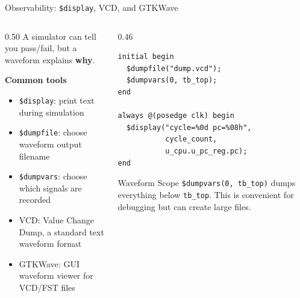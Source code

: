 \documentclass[aspectratio=169,10pt]{beamer}
\begin{document}
\begin{frame}[fragile]{Observability: \texttt{\$display}, VCD, and GTKWave}
  \begin{columns}[T]
    \begin{column}{0.50\textwidth}
      A simulator can tell you pass/fail, but a waveform explains \textbf{why}.

      \vspace{0.7em}
      \textbf{Common tools}
      \begin{itemize}
        \item \texttt{\$display}: print text during simulation
        \item \texttt{\$dumpfile}: choose waveform output filename
        \item \texttt{\$dumpvars}: choose which signals are recorded
        \item VCD: Value Change Dump, a standard text waveform format
        \item GTKWave: GUI waveform viewer for VCD/FST files
      \end{itemize}
    \end{column}
    \begin{column}{0.46\textwidth}
\begin{lstlisting}
initial begin
  $dumpfile("dump.vcd");
  $dumpvars(0, tb_top);
end

always @(posedge clk) begin
  $display("cycle=%0d pc=%08h",
           cycle_count,
           u_cpu.u_pc_reg.pc);
end
\end{lstlisting}

      \vspace{0.4em}
      \begin{block}{Waveform Scope}
        \texttt{\$dumpvars(0, tb\_top)} dumps everything below \texttt{tb\_top}. This is convenient for debugging but can create large files.
      \end{block}
    \end{column}
  \end{columns}
\end{frame}
\end{document}
